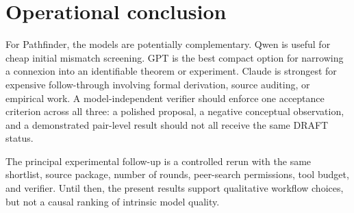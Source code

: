 \documentclass[11pt,a4paper]{article}
\begin{document}
\section{Operational conclusion}

For Pathfinder, the models are potentially complementary.  Qwen is useful for
cheap initial mismatch screening.  GPT is the best compact option for narrowing
a connexion into an identifiable theorem or experiment.  Claude is strongest
for expensive follow-through involving formal derivation, source auditing, or
empirical work.  A model-independent verifier should enforce one acceptance
criterion across all three: a polished proposal, a negative conceptual
observation, and a demonstrated pair-level result should not all receive the
same DRAFT status.

The principal experimental follow-up is a controlled rerun with the same
shortlist, source package, number of rounds, peer-search permissions, tool
budget, and verifier.  Until then, the present results support qualitative
workflow choices, but not a causal ranking of intrinsic model quality.
\end{document}
